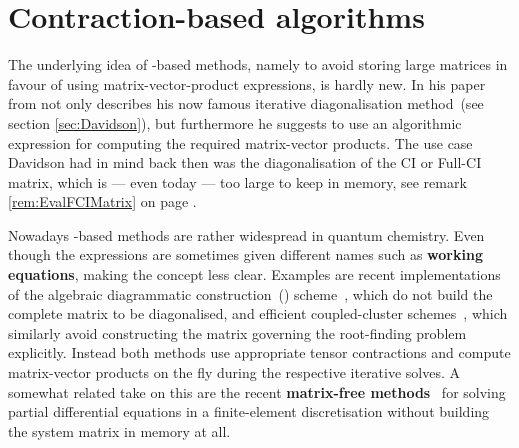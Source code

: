 \section{Contraction-based algorithms}
\label{sec:ContractionAlgos}

The underlying idea of \contraction-based methods,
namely to avoid storing large matrices in favour of using
matrix-vector-product expressions,
is hardly new.
In his paper from \citeyear{Davidson1975}
\citet{Davidson1975} not only describes his now famous
iterative diagonalisation method~(see section \ref{sec:Davidson}),
but furthermore he suggests to use an algorithmic expression
for computing the required matrix-vector products.
The use case Davidson had in mind back then was the
diagonalisation of the CI or Full-CI matrix,
which is --- even today --- too large to keep in memory,
see remark \ref{rem:EvalFCIMatrix} on page \pageref{rem:EvalFCIMatrix}.

Nowadays \contraction-based methods
are rather widespread in quantum chemistry.
Even though the \contraction expressions are sometimes given different
names such as \textbf{working equations},
making the concept less clear.
Examples are recent implementations of the algebraic diagrammatic construction~(\ADC)
scheme~\cite{Wormit2009,Wormit2014,Dreuw2014},
which do not build the complete \ADC matrix to be diagonalised,
and efficient coupled-cluster schemes~\cite{Helgaker2013},
which similarly avoid constructing the matrix
governing the \CC root-finding problem explicitly.
Instead both methods use appropriate tensor contractions
and compute matrix-vector products on the fly
during the respective iterative solves.
A somewhat related take on this are the recent
\textbf{matrix-free methods}~\cite{Kronbichler2012}
for solving partial differential equations in a finite-element discretisation
without building the system matrix in memory at all.

